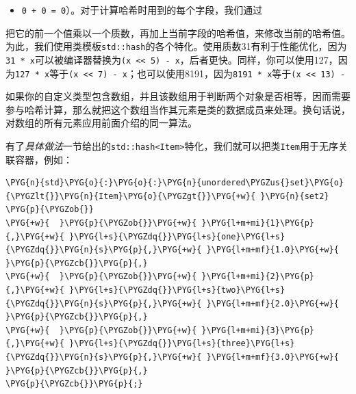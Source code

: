 
\begin{itemize}
\item \texttt{0 + 0 = 0}）。对于计算哈希时用到的每个字段，我们通过

\end{itemize}



把它的前一个值乘以一个质数，再加上当前字段的哈希值，来修改当前的哈希值。为此，我们使用类模板\texttt{std::\allowbreak{}hash}的各个特化。使用质数31有利于性能优化，因为\texttt{31 * x}可以被编译器替换为\texttt{(\allowbreak{}x << 5) - x}，后者更快。同样，你可以使用127，因为\texttt{127 * x}等于\texttt{(\allowbreak{}x << 7) - x}；也可以使用8191，因为\texttt{8191 * x}等于\texttt{(\allowbreak{}x << 13) -}



如果你的自定义类型包含数组，并且该数组用于判断两个对象是否相等，因而需要参与哈希计算，那么就把这个数组当作其元素是类的数据成员来处理。换句话说，对数组的所有元素应用前面介绍的同一算法。



有了\textit{具体做法}一节给出的\texttt{std::\allowbreak{}hash<\allowbreak{}Item>}特化，我们就可以把类\texttt{Item}用于无序关联容器，例如：



\begin{codeblockbg}
\begin{Verbatim}[commandchars=\\\{\},breaklines=true,breakanywhere=true,fontsize=\codefont,xleftmargin=17bp]
\PYG{n}{std}\PYG{o}{:}\PYG{o}{:}\PYG{n}{unordered\PYGZus{}set}\PYG{o}{\PYGZlt{}}\PYG{n}{Item}\PYG{o}{\PYGZgt{}}\PYG{+w}{ }\PYG{n}{set2}
\PYG{p}{\PYGZob{}}
\PYG{+w}{  }\PYG{p}{\PYGZob{}}\PYG{+w}{ }\PYG{l+m+mi}{1}\PYG{p}{,}\PYG{+w}{ }\PYG{l+s}{\PYGZdq{}}\PYG{l+s}{one}\PYG{l+s}{\PYGZdq{}}\PYG{n}{s}\PYG{p}{,}\PYG{+w}{ }\PYG{l+m+mf}{1.0}\PYG{+w}{ }\PYG{p}{\PYGZcb{}}\PYG{p}{,}
\PYG{+w}{  }\PYG{p}{\PYGZob{}}\PYG{+w}{ }\PYG{l+m+mi}{2}\PYG{p}{,}\PYG{+w}{ }\PYG{l+s}{\PYGZdq{}}\PYG{l+s}{two}\PYG{l+s}{\PYGZdq{}}\PYG{n}{s}\PYG{p}{,}\PYG{+w}{ }\PYG{l+m+mf}{2.0}\PYG{+w}{ }\PYG{p}{\PYGZcb{}}\PYG{p}{,}
\PYG{+w}{  }\PYG{p}{\PYGZob{}}\PYG{+w}{ }\PYG{l+m+mi}{3}\PYG{p}{,}\PYG{+w}{ }\PYG{l+s}{\PYGZdq{}}\PYG{l+s}{three}\PYG{l+s}{\PYGZdq{}}\PYG{n}{s}\PYG{p}{,}\PYG{+w}{ }\PYG{l+m+mf}{3.0}\PYG{+w}{ }\PYG{p}{\PYGZcb{}}\PYG{p}{,}
\PYG{p}{\PYGZcb{}}\PYG{p}{;}
\end{Verbatim}
\end{codeblockbg}


